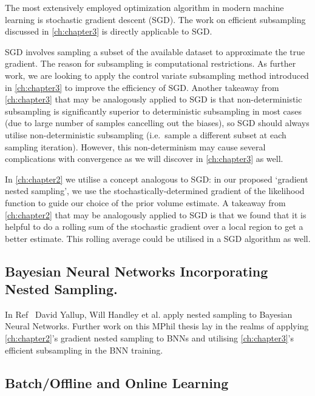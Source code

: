 The most extensively employed optimization algorithm in modern machine learning is stochastic gradient descent (SGD). The work on efficient subsampling discussed in \cref{ch:chapter3} is directly applicable to SGD.

SGD involves sampling a subset of the available dataset to approximate the true gradient. The reason for subsampling is computational restrictions. As further work, we are looking to apply the control variate subsampling method introduced in \cref{ch:chapter3} to improve the efficiency of SGD. Another takeaway from \cref{ch:chapter3} that may be analogously applied to SGD is that non-deterministic subsampling is significantly superior to deterministic subsampling in most cases (due to large number of samples cancelling out the biases), so SGD should always utilise non-deterministic subsampling (i.e.\ sample a different subset at each sampling iteration). However, this non-determinism may cause several complications with convergence as we will discover in \cref{ch:chapter3} as well.


In \cref{ch:chapter2} we utilise a concept analogous to SGD: in our proposed `gradient nested sampling', we use the stochastically-determined gradient of the likelihood function to guide our choice of the prior volume estimate. A takeaway from \cref{ch:chapter2} that may be analogously applied to SGD is that we found that it is helpful to do a rolling sum of the stochastic gradient over a local region to get a better estimate. This rolling average could be utilised in a SGD algorithm as well.

\subsection{Bayesian Neural Networks Incorporating Nested Sampling.}


In Ref~\cite{https://doi.org/10.48550/arxiv.2205.11151} David Yallup, Will Handley et al. apply nested sampling to Bayesian Neural Networks. Further work on this MPhil thesis lay in the realms of applying \cref{ch:chapter2}'s gradient nested sampling to BNNs and utilising \cref{ch:chapter3}'s efficient subsampling in the BNN training.


\subsection{Batch/Offline and Online Learning}

